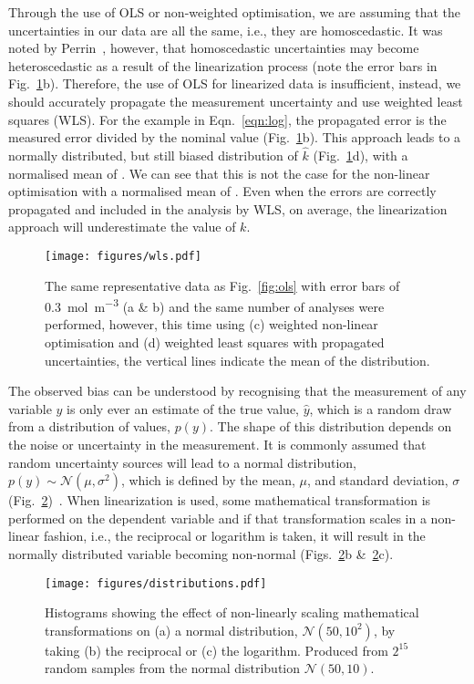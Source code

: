 \documentclass[journal=jceda8,manuscript=article]{achemso}
\begin{document}
Through the use of OLS or non-weighted optimisation, we are assuming that the uncertainties in our data are all the same, i.e., they are homoscedastic. 
It was noted by Perrin~\cite{perrin_linear_2017}, however, that homoscedastic uncertainties may become heteroscedastic as a result of the linearization process (note the error bars in Fig.~\ref{fig:wls}b). 
Therefore, the use of OLS for linearized data is insufficient, instead, we should accurately propagate the measurement uncertainty and use weighted least squares (WLS).
For the example in Eqn.~\ref{eqn:log}, the propagated error is the measured error divided by the nominal value (Fig.~\ref{fig:wls}b).
This approach leads to a normally distributed, but still biased distribution of $\hat{k}$ (Fig.~\ref{fig:wls}d), with a normalised mean of .
We can see that this is not the case for the non-linear optimisation with a normalised mean of .
Even when the errors are correctly propagated and included in the analysis by WLS, on average, the linearization approach will underestimate the value of $k$.
%
\begin{figure}
  \texttt{[image: figures/wls.pdf]}
  \caption{
    The same representative data as Fig.~\ref{fig:ols} with error bars of \SI{0.3}{{\mol\m^{-3}}} (a \& b) and the same number of analyses were performed, however, this time using (c) weighted non-linear optimisation and (d) weighted least squares with propagated uncertainties, the vertical lines indicate the mean of the distribution. 
    }
  \label{fig:wls}
\end{figure}
%

The observed bias can be understood by recognising that the measurement of any variable $y$ is only ever an estimate of the true value, $\hat{y}$, which is a random draw from a distribution of values, $p(y)$. 
The shape of this distribution depends on the noise or uncertainty in the measurement. 
It is commonly assumed that random uncertainty sources will lead to a normal distribution, $p(y) \sim \mathcal{N}(\mu, \sigma^2)$, which is defined by the mean, $\mu$, and standard deviation, $\sigma$ (Fig.~\ref{fig:distributions})~\cite{monk_math_2010}.
When linearization is used, some mathematical transformation is performed on the dependent variable and if that transformation scales in a non-linear fashion, i.e., the reciprocal or logarithm is taken, it will result in the normally distributed variable becoming non-normal (Figs.~\ref{fig:distributions}b \&~\ref{fig:distributions}c).
%
\begin{figure}
  \texttt{[image: figures/distributions.pdf]}
  \caption{
    Histograms showing the effect of non-linearly scaling mathematical transformations on (a) a normal distribution, $\mathcal{N}(50, 10^2)$, by taking (b) the reciprocal or (c) the logarithm. 
    Produced from $2^{15}$ random samples from the normal distribution $\mathcal{N}(50, 10)$.
    }
  \label{fig:distributions}
\end{figure}
%
\end{document}

